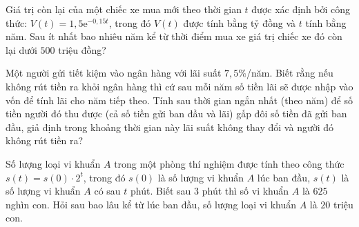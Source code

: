 \begin{ex}%
	Giá trị còn lại của một chiếc xe mua mới theo thời gian $t$ được xác định bởi công thức: $V(t)=1{,}5\mathrm{e}^{-0{,}15t} $, trong đó $V(t)$ được tính bằng tỷ đồng và $t$ tính bằng năm. Sau ít nhất bao nhiêu năm kể  từ thời điểm mua xe giá trị chiếc xe đó còn lại dưới $500$ triệu đồng?
\end{ex}

\begin{ex}%
	Một người gửi tiết kiệm vào ngân hàng với lãi suất $7{,}5\%$/năm. Biết rằng nếu không  rút tiền ra khỏi ngân hàng thì cứ sau mỗi năm số tiền lãi sẽ được nhập vào vốn để tính lãi cho năm tiếp theo. Tính sau thời gian ngắn nhất (theo năm) để số tiền người đó thu được (cả số tiền gửi ban đầu và lãi) gấp đôi số tiền đã gửi ban đầu, giả định trong khoảng thời gian này lãi suất không thay đổi và người đó không rút tiền ra?
\end{ex}

\begin{ex}%
	Số lượng loại vi khuẩn $A$ trong một phòng thí nghiệm được tính theo công thức $s(t)=s(0)\cdot2^t  $, trong đó $s(0)$ là số lượng vi khuẩn $A$ lúc ban đầu, $s(t)$ là số lượng vi khuẩn $A$ có sau $t$ phút. Biết sau $3$ phút thì số vi khuẩn $A$ là $625$ nghìn con. Hỏi sau bao lâu kể từ lúc ban đầu, số lượng loại vi khuẩn $A$ là $20$ triệu con.
\end{ex}

